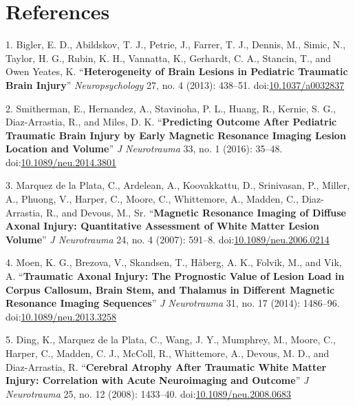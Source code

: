 \documentclass[11pt,]{article}
\begin{document}
\clearpage

\section*{References}\label{references}

\hypertarget{refs}{}
\hypertarget{ref-Bigler:2013aa}{}
1. Bigler, E. D., Abildskov, T. J., Petrie, J., Farrer, T. J., Dennis,
M., Simic, N., Taylor, H. G., Rubin, K. H., Vannatta, K., Gerhardt, C.
A., Stancin, T., and Owen Yeates, K. ``\textbf{Heterogeneity of Brain
Lesions in Pediatric Traumatic Brain Injury}'' \emph{Neuropsychology}
27, no. 4 (2013): 438--51.
doi:\href{https://doi.org/10.1037/a0032837}{10.1037/a0032837}

\hypertarget{ref-Smitherman:2016aa}{}
2. Smitherman, E., Hernandez, A., Stavinoha, P. L., Huang, R., Kernie,
S. G., Diaz-Arrastia, R., and Miles, D. K. ``\textbf{Predicting Outcome
After Pediatric Traumatic Brain Injury by Early Magnetic Resonance
Imaging Lesion Location and Volume}'' \emph{J Neurotrauma} 33, no. 1
(2016): 35--48.
doi:\href{https://doi.org/10.1089/neu.2014.3801}{10.1089/neu.2014.3801}

\hypertarget{ref-Marquez-de-la-Plata:2007aa}{}
3. Marquez de la Plata, C., Ardelean, A., Koovakkattu, D., Srinivasan,
P., Miller, A., Phuong, V., Harper, C., Moore, C., Whittemore, A.,
Madden, C., Diaz-Arrastia, R., and Devous, M., Sr. ``\textbf{Magnetic
Resonance Imaging of Diffuse Axonal Injury: Quantitative Assessment of
White Matter Lesion Volume}'' \emph{J Neurotrauma} 24, no. 4 (2007):
591--8.
doi:\href{https://doi.org/10.1089/neu.2006.0214}{10.1089/neu.2006.0214}

\hypertarget{ref-Moen:2014aa}{}
4. Moen, K. G., Brezova, V., Skandsen, T., Håberg, A. K., Folvik, M.,
and Vik, A. ``\textbf{Traumatic Axonal Injury: The Prognostic Value of
Lesion Load in Corpus Callosum, Brain Stem, and Thalamus in Different
Magnetic Resonance Imaging Sequences}'' \emph{J Neurotrauma} 31, no. 17
(2014): 1486--96.
doi:\href{https://doi.org/10.1089/neu.2013.3258}{10.1089/neu.2013.3258}

\hypertarget{ref-Ding:2008aa}{}
5. Ding, K., Marquez de la Plata, C., Wang, J. Y., Mumphrey, M., Moore,
C., Harper, C., Madden, C. J., McColl, R., Whittemore, A., Devous, M.
D., and Diaz-Arrastia, R. ``\textbf{Cerebral Atrophy After Traumatic
White Matter Injury: Correlation with Acute Neuroimaging and Outcome}''
\emph{J Neurotrauma} 25, no. 12 (2008): 1433--40.
doi:\href{https://doi.org/10.1089/neu.2008.0683}{10.1089/neu.2008.0683}
\end{document}
